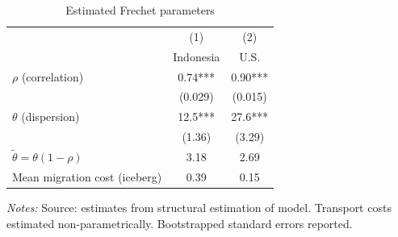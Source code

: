 \begin{table}[hbpt] \begin{center}\begin{threeparttable}\caption{ {Estimated Frechet parameters}} \begin{tabular}{l*{2}c} \toprule
&(1)&(2)\\
&Indonesia&U.S.\\
\midrule
$\rho$ (correlation)&0.74***&0.90***\\
&(0.029)&(0.015)\\
$\theta$ (dispersion)&12.5***&27.6***\\
&(1.36)&(3.29)\\
\midrule
$\tilde{\theta} = \theta(1-\rho)$&3.18&2.69\\
Mean migration cost (iceberg)&0.39&0.15\\
\bottomrule \end{tabular} \label{Estimated Frechet parameters} \begin{tablenotes} \item {\footnotesize \emph{Notes: } Source: estimates from structural estimation of model. Transport costs estimated non-parametrically. Bootstrapped standard errors reported. } \end{tablenotes} \end{threeparttable} \end{center} \end{table}
